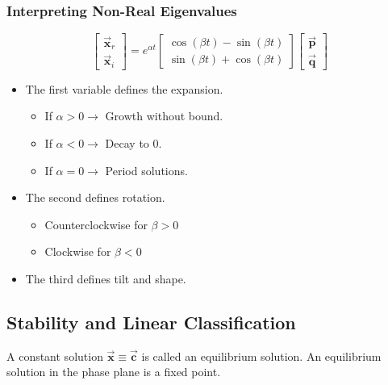 \documentclass[12pt, landscape, twocolumn]{article}
\let\oldvec\vec
\renewcommand{\vec}[1]{\oldvec{\mathbf{ #1 } } }                    %
\begin{document}
        \subsubsection{Interpreting Non-Real Eigenvalues}
        \[
            \left[ \begin{array}{c}
                \vec{x}_r\\
                \vec{x}_i
            \end{array} \right] = e^{\alpha t}
            \left[ \begin{array}{c}
                \cos(\beta t) - \sin(\beta t)\\
                \sin(\beta t) + \cos(\beta t)
            \end{array} \right]
            \left[ \begin{array}{c}
                \vec{p}\\
                \vec{q}
            \end{array} \right]
        \]

        \begin{itemize}
            \item The first variable defines the expansion.
                \begin{itemize}
                    \item If $\alpha > 0 \to$ Growth without bound.
                    \item If $\alpha < 0 \to$ Decay to $0$.
                    \item If $\alpha = 0 \to$ Period solutions.
                \end{itemize}
            \item The second defines rotation.
                \begin{itemize}
                    \item Counterclockwise for $\beta > 0$
                    \item Clockwise for $\beta < 0$
                \end{itemize}
            \item The third defines tilt and shape.
        \end{itemize}

    \subsection{Stability and Linear Classification}
    A constant solution $\vec{x} \equiv \vec{c}$ is called an equilibrium solution. An equilibrium solution in the phase plane is a fixed point.
\end{document}
